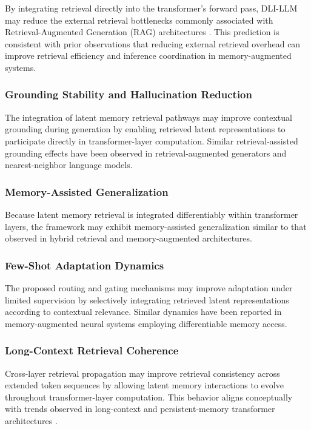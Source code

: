 By integrating retrieval directly into the transformer's forward pass, DLI-LLM may reduce the external retrieval bottlenecks commonly associated with Retrieval-Augmented Generation (RAG) architectures \cite{Wu2022}. This prediction is consistent with prior observations that reducing external retrieval overhead can improve retrieval efficiency and inference coordination in memory-augmented systems.
\hypertarget{grounding-stability-and-hallucination-reduction}{%
\subsubsection{Grounding Stability and Hallucination Reduction}}
\label{grounding-stability-and-hallucination-reduction}
The integration of latent memory retrieval pathways may improve contextual grounding during generation by enabling retrieved latent representations to participate directly in transformer-layer computation. Similar retrieval-assisted grounding effects have been observed in retrieval-augmented generators and nearest-neighbor language models.
\hypertarget{memory-assisted-generalization}{%
\subsubsection{Memory-Assisted Generalization}
\label{memory-assisted-generalization}}
Because latent memory retrieval is integrated differentiably within transformer layers, the framework may exhibit memory-assisted generalization similar to that observed in hybrid retrieval and memory-augmented architectures.
\hypertarget{few-shot-adaptation-dynamics}{%
\subsubsection{Few-Shot Adaptation Dynamics}}
\label{few-shot-adaptation-dynamics}
The proposed routing and gating mechanisms may improve adaptation under limited supervision by selectively integrating retrieved latent representations according to contextual relevance. Similar dynamics have been reported in memory-augmented neural systems employing differentiable memory access.
\hypertarget{long-context-retrieval-coherence}{%
\subsubsection{Long-Context Retrieval Coherence}}
\label{long-context-retrieval-coherence}
Cross-layer retrieval propagation may improve retrieval consistency across extended token sequences by allowing latent memory interactions to evolve throughout transformer-layer computation. This behavior aligns conceptually with trends observed in long-context and persistent-memory transformer architectures \cite{Bulatov2022}.
